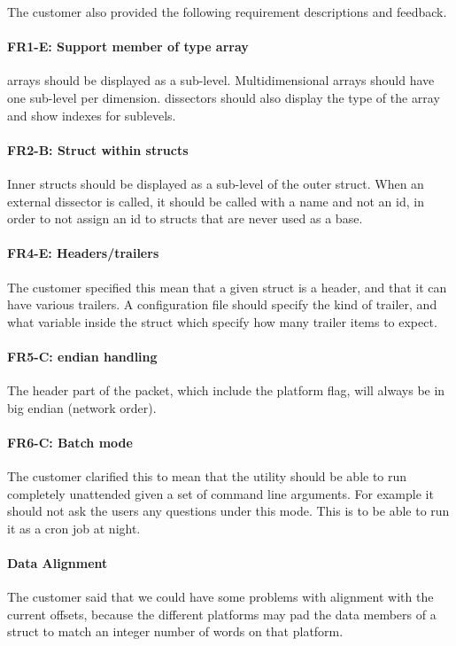\noindent The customer also provided the following requirement descriptions
and feedback.
\paragraph{FR1-E: Support member of type array}
\Glspl{array} should be displayed as a sub-level. Multidimensional
\glspl{array} should have one sub-level per dimension. \Glspl{dissector} should
also display the type of the \gls{array} and show indexes for sublevels.

\paragraph{FR2-B: Struct within structs}
Inner \glspl{struct} should be displayed as a
sub-level of the outer \gls{struct}. When an external \gls{dissector} is
called, it should be called with a name and not an id, in order to not
assign an id to \glspl{struct} that are never used as a base.

\paragraph{FR4-E: Headers/trailers}
The customer specified this mean that a given \gls{struct} is a \gls{header},
and that it can have various \gls{trailers}. A configuration file should
specify the kind of trailer, and what variable inside the \gls{struct} which
specify how many trailer items to expect.

\paragraph{FR5-C: \Gls{endian} handling}
The \gls{header} part of the \gls{packet}, which include the platform flag,
will always be in big \gls{endian} (network order).

\paragraph{FR6-C: Batch mode}
The customer clarified this to mean that the \gls{utility} should be able to
run completely unattended given a set of command line arguments. For example
it should not ask the users any questions under this mode. This is to be able
to run it as a \gls{cron} job at night.

\paragraph{Data Alignment}
The customer said that we could have some problems with alignment with the
current offsets, because the different platforms may pad the data
\glspl{member} of a \gls{struct} to match an \gls{integer} number of words on
that platform.

